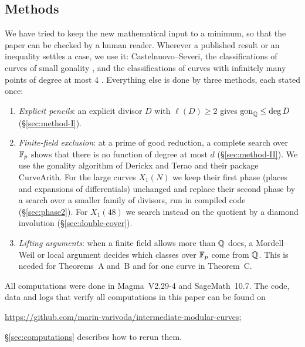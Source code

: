 \subsection{Methods}
We have tried to keep the new mathematical input to a minimum, so that the paper can be checked by a human
reader. Wherever a published result or an inequality settles a case, we use it: Castelnuovo--Severi, the
classifications of curves of small gonality \cite{JeonKim2007,JeonKimSchweizer2020,Orlic2025}, and the
classifications of curves with infinitely many points of degree at most $4$
\cite{JeonKimSchweizer2020,Dalal2024,DerickxOrlic2026,DHJO}. Everything else is done by three methods,
each stated once:
\begin{enumerate}
\item[I.] \emph{Explicit pencils}: an explicit divisor $D$ with $\ell(D)\ge2$ gives $\operatorname{gon}_{\mathbb{Q}}\le\deg D$
 (\S\ref{sec:method-I}).
\item[II.] \emph{Finite-field exclusion}: at a prime of good reduction, a complete search over $\mathbb{F}_p$ shows
 that there is no function of degree at most $d$ (\S\ref{sec:method-II}). We use the gonality algorithm of
 Derickx and Terao \cite{DerickxTerao} and their package CurveArith. For the large curves $X_1(N)$ we keep
 their first phase (places and expansions of differentials) unchanged and replace their second phase by a
 search over a smaller family of divisors, run in compiled code (\S\ref{sec:phase2}). For $X_1(48)$ we
 search instead on the quotient by a diamond involution (\S\ref{sec:double-cover}).
\item[III.] \emph{Lifting arguments}: when a finite field allows more than $\mathbb{Q}$ does, a Mordell--Weil or
 local argument decides which classes over $\mathbb{F}_p$ come from $\mathbb{Q}$. This is needed for Theorems~A
 and~B and for one curve in Theorem~C.
\end{enumerate}

All computations were done in Magma~V2.29-4 \cite{Magma} and SageMath~10.7. The code, data and logs
that verify all computations in this paper can be found on
\begin{center}
 \url{https://github.com/marin-varivoda/intermediate-modular-curves};
\end{center}
\S\ref{sec:computations} describes how to rerun them.
